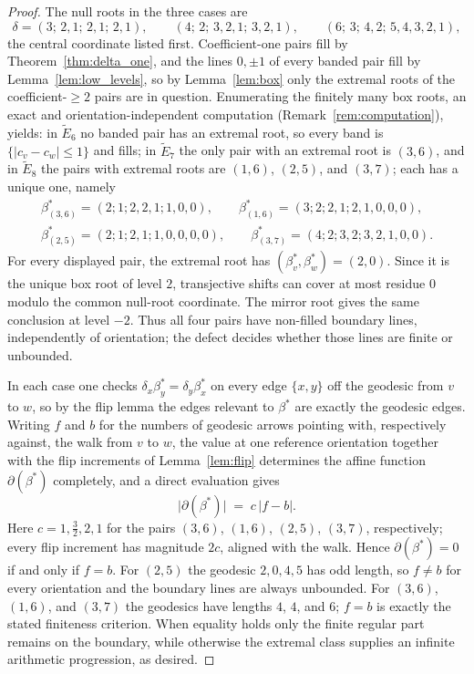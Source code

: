\documentclass[11pt, a4paper]{amsart}
\theoremstyle{definition}
\begin{document}
\begin{proof}
The null roots in the three cases are
\[
  \delta = (3;\, 2, 1;\, 2, 1;\, 2, 1), \qquad
  (4;\, 2;\, 3, 2, 1;\, 3, 2, 1), \qquad
  (6;\, 3;\, 4, 2;\, 5, 4, 3, 2, 1),
\]
the central coordinate listed first. Coefficient-one pairs fill by
Theorem~\ref{thm:delta_one}, and the lines $0, \pm 1$ of every banded pair
fill by Lemma~\ref{lem:low_levels}, so by Lemma~\ref{lem:box} only the
extremal roots of the coefficient-$\geq 2$ pairs are in question.
Enumerating the finitely many box roots, an exact and
orientation-independent computation (Remark~\ref{rem:computation}), yields:
in $\widetilde{E}_6$ no banded pair has an extremal root, so every band is
$\{|c_v - c_w| \leq 1\}$ and fills; in $\widetilde{E}_7$ the only pair with
an extremal root is $(3, 6)$, and in $\widetilde{E}_8$ the pairs with
extremal roots are $(1, 6)$, $(2, 5)$, and $(3, 7)$; each has a unique
one, namely
\begin{gather*}
  \beta^{*}_{(3,6)} = (2; 1; 2, 2, 1; 1, 0, 0), \qquad
  \beta^{*}_{(1,6)} = (3; 2; 2, 1; 2, 1, 0, 0, 0), \\
  \beta^{*}_{(2,5)} = (2; 1; 2, 1; 1, 0, 0, 0, 0), \qquad
  \beta^{*}_{(3,7)} = (4; 2; 3, 2; 3, 2, 1, 0, 0).
\end{gather*}
For every displayed pair, the extremal root has
$(\beta_v^{*},\beta_w^{*})=(2,0)$. Since it is the unique box root of level
$2$, transjective shifts can cover at most residue $0$ modulo the common
null-root coordinate. The mirror root gives the same conclusion at level
$-2$. Thus all four pairs have non-filled boundary lines, independently of
orientation; the defect decides whether those lines are finite or
unbounded.

In each case one checks $\delta_x \beta^{*}_y = \delta_y \beta^{*}_x$ on
every edge $\{x, y\}$ off the geodesic from $v$ to $w$, so by the flip
lemma the edges relevant to $\beta^{*}$ are exactly the geodesic edges.
Writing $f$ and $b$ for the numbers of geodesic arrows pointing with,
respectively against, the walk from $v$ to $w$, the value at one reference
orientation together with the flip increments of Lemma~\ref{lem:flip}
determines the affine function $\partial(\beta^{*})$ completely, and a
direct evaluation gives
\[
  \bigl|\partial(\beta^{*})\bigr| \;=\; c \, |f - b|.
\]
Here $c=1, \tfrac{3}{2}, 2, 1$ for the pairs $(3,6)$, $(1,6)$, $(2,5)$,
$(3,7)$, respectively; every flip increment has magnitude $2c$, aligned with the
walk. Hence $\partial(\beta^{*}) = 0$ if and only if $f = b$. For $(2, 5)$
the geodesic $2, 0, 4, 5$ has odd length, so $f \neq b$ for every
orientation and the boundary lines are always unbounded. For $(3, 6)$,
$(1, 6)$, and $(3, 7)$ the geodesics have lengths $4$, $4$, and $6$;
$f=b$ is exactly the stated finiteness criterion. When equality holds only
the finite regular part remains on the boundary, while otherwise the
extremal class supplies an infinite arithmetic progression, as desired.
\end{proof}
\end{document}
